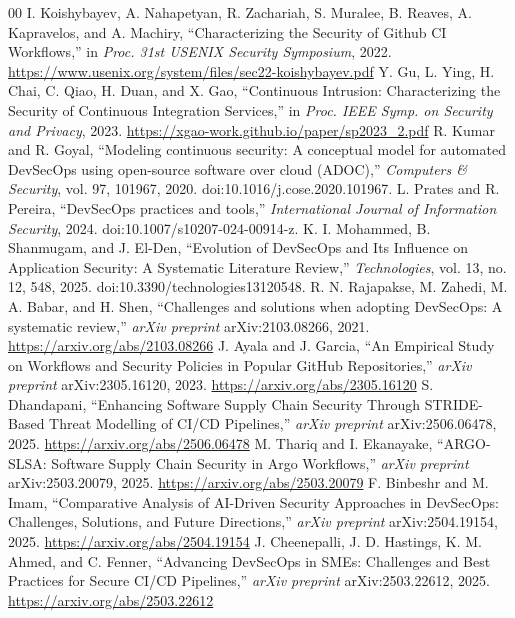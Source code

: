 \documentclass[conference]{IEEEtran}
\begin{document}
\begin{thebibliography}{00}
 I. Koishybayev, A. Nahapetyan, R. Zachariah, S. Muralee, B. Reaves, A. Kapravelos, and A. Machiry, ``Characterizing the Security of Github CI Workflows,'' in \emph{Proc. 31st USENIX Security Symposium}, 2022. \url{https://www.usenix.org/system/files/sec22-koishybayev.pdf}
 Y. Gu, L. Ying, H. Chai, C. Qiao, H. Duan, and X. Gao, ``Continuous Intrusion: Characterizing the Security of Continuous Integration Services,'' in \emph{Proc. IEEE Symp. on Security and Privacy}, 2023. \url{https://xgao-work.github.io/paper/sp2023_2.pdf}
 R. Kumar and R. Goyal, ``Modeling continuous security: A conceptual model for automated DevSecOps using open-source software over cloud (ADOC),'' \emph{Computers \& Security}, vol. 97, 101967, 2020. doi:10.1016/j.cose.2020.101967.
 L. Prates and R. Pereira, ``DevSecOps practices and tools,'' \emph{International Journal of Information Security}, 2024. doi:10.1007/s10207-024-00914-z.
 K. I. Mohammed, B. Shanmugam, and J. El-Den, ``Evolution of DevSecOps and Its Influence on Application Security: A Systematic Literature Review,'' \emph{Technologies}, vol. 13, no. 12, 548, 2025. doi:10.3390/technologies13120548.
 R. N. Rajapakse, M. Zahedi, M. A. Babar, and H. Shen, ``Challenges and solutions when adopting DevSecOps: A systematic review,'' \emph{arXiv preprint} arXiv:2103.08266, 2021. \url{https://arxiv.org/abs/2103.08266}
 J. Ayala and J. Garcia, ``An Empirical Study on Workflows and Security Policies in Popular GitHub Repositories,'' \emph{arXiv preprint} arXiv:2305.16120, 2023. \url{https://arxiv.org/abs/2305.16120}
 S. Dhandapani, ``Enhancing Software Supply Chain Security Through STRIDE-Based Threat Modelling of CI/CD Pipelines,'' \emph{arXiv preprint} arXiv:2506.06478, 2025. \url{https://arxiv.org/abs/2506.06478}
 M. Thariq and I. Ekanayake, ``ARGO-SLSA: Software Supply Chain Security in Argo Workflows,'' \emph{arXiv preprint} arXiv:2503.20079, 2025. \url{https://arxiv.org/abs/2503.20079}
 F. Binbeshr and M. Imam, ``Comparative Analysis of AI-Driven Security Approaches in DevSecOps: Challenges, Solutions, and Future Directions,'' \emph{arXiv preprint} arXiv:2504.19154, 2025. \url{https://arxiv.org/abs/2504.19154}
 J. Cheenepalli, J. D. Hastings, K. M. Ahmed, and C. Fenner, ``Advancing DevSecOps in SMEs: Challenges and Best Practices for Secure CI/CD Pipelines,'' \emph{arXiv preprint} arXiv:2503.22612, 2025. \url{https://arxiv.org/abs/2503.22612}

\end{thebibliography}
\end{document}
